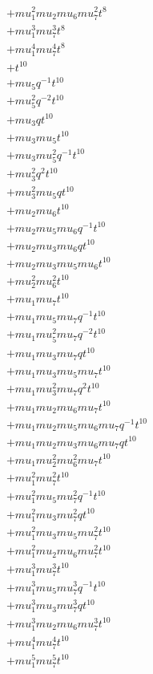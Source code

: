 \begin{align*}
  + mu_1^{2} mu_2 mu_6 mu_7^{2} t^{8} \\
  + mu_1^{3} mu_7^{3} t^{8} \\
  + mu_1^{4} mu_7^{4} t^{8} \\
  + t^{10} \\
  + mu_5 q^{-1} t^{10} \\
  + mu_5^{2} q^{-2} t^{10} \\
  + mu_3 q t^{10} \\
  + mu_3 mu_5 t^{10} \\
  + mu_3 mu_5^{2} q^{-1} t^{10} \\
  + mu_3^{2} q^{2} t^{10} \\
  + mu_3^{2} mu_5 q t^{10} \\
  + mu_2 mu_6 t^{10} \\
  + mu_2 mu_5 mu_6 q^{-1} t^{10} \\
  + mu_2 mu_3 mu_6 q t^{10} \\
  + mu_2 mu_3 mu_5 mu_6 t^{10} \\
  + mu_2^{2} mu_6^{2} t^{10} \\
  + mu_1 mu_7 t^{10} \\
  + mu_1 mu_5 mu_7 q^{-1} t^{10} \\
  + mu_1 mu_5^{2} mu_7 q^{-2} t^{10} \\
  + mu_1 mu_3 mu_7 q t^{10} \\
  + mu_1 mu_3 mu_5 mu_7 t^{10} \\
  + mu_1 mu_3^{2} mu_7 q^{2} t^{10} \\
  + mu_1 mu_2 mu_6 mu_7 t^{10} \\
  + mu_1 mu_2 mu_5 mu_6 mu_7 q^{-1} t^{10} \\
  + mu_1 mu_2 mu_3 mu_6 mu_7 q t^{10} \\
  + mu_1 mu_2^{2} mu_6^{2} mu_7 t^{10} \\
  + mu_1^{2} mu_7^{2} t^{10} \\
  + mu_1^{2} mu_5 mu_7^{2} q^{-1} t^{10} \\
  + mu_1^{2} mu_3 mu_7^{2} q t^{10} \\
  + mu_1^{2} mu_3 mu_5 mu_7^{2} t^{10} \\
  + mu_1^{2} mu_2 mu_6 mu_7^{2} t^{10} \\
  + mu_1^{3} mu_7^{3} t^{10} \\
  + mu_1^{3} mu_5 mu_7^{3} q^{-1} t^{10} \\
  + mu_1^{3} mu_3 mu_7^{3} q t^{10} \\
  + mu_1^{3} mu_2 mu_6 mu_7^{3} t^{10} \\
  + mu_1^{4} mu_7^{4} t^{10} \\
  + mu_1^{5} mu_7^{5} t^{10}
\end{align*}
